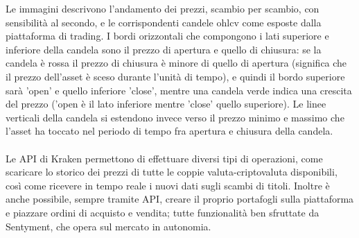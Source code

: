 \documentclass{article}
\begin{document}
		
		Le immagini descrivono l'andamento dei prezzi, scambio per scambio, con sensibilità al secondo, e le corrispondenti candele ohlcv come esposte dalla piattaforma di trading. I bordi orizzontali che compongono i lati superiore e inferiore della candela sono il prezzo di apertura e quello di chiusura: se la candela è rossa il prezzo di chiusura è minore di quello di apertura (significa che il prezzo dell'asset è sceso durante l'unità di tempo), e quindi il bordo superiore sarà 'open' e quello inferiore 'close', mentre una candela verde indica una crescita del prezzo ('open è il lato inferiore mentre 'close' quello superiore). Le linee verticali della candela si estendono invece verso il prezzo minimo e massimo che l'asset ha toccato nel periodo di tempo fra apertura e chiusura della candela.
		\\~\\
		Le API di Kraken permettono di effettuare diversi tipi di operazioni, come scaricare lo storico dei prezzi di tutte le coppie valuta-criptovaluta disponibili, così come ricevere in tempo reale i nuovi dati sugli scambi di titoli. Inoltre è anche possibile, sempre tramite API, creare il proprio portafogli sulla piattaforma e piazzare ordini di acquisto e vendita; tutte funzionalità ben sfruttate da Sentyment, che opera sul mercato in autonomia.
		
		
		
\end{document}
